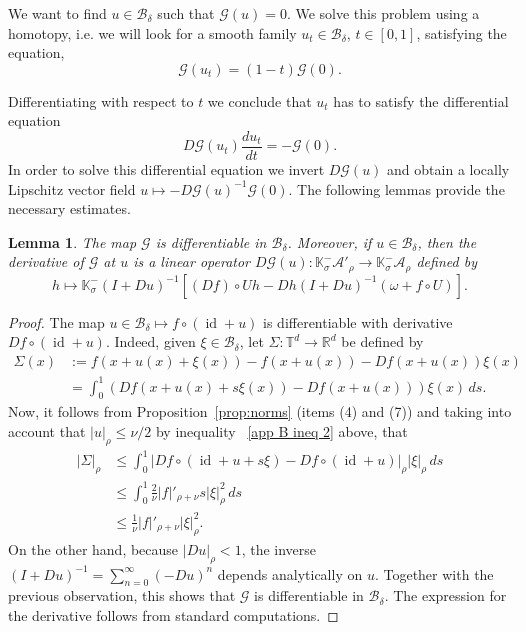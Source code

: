\documentclass[12pt,reqno,a4paper]{amsart}%
\numberwithin{equation}{section}
\newtheorem{lemma}[theorem]{Lemma}
\newcommand{\Bs}{{\mathscr{B}}}
\newcommand{\A}{{\mathcal A}}
\newcommand{\GG}{{\mathcal G}}
\newcommand{\Kk}{{\mathbb{K}}}
\newcommand{\Rr}{{\mathbb{R}}}
\newcommand{\Tt}{{\mathbb{T}}}
\newcommand{\id}  {\operatorname{id}}
\begin{document}
We want to find $u\in\Bs_{\delta}$ such that $\GG(u)=0$. We solve this problem using a homotopy, i.e. we will look for a smooth family $u_t\in\Bs_{\delta}$, $t\in[0,1]$, satisfying the equation,
$$
\GG(u_t)=(1-t)\GG(0).
$$



Differentiating with respect to $t$ we conclude that $u_t$ has to satisfy the differential equation
$$
D\GG(u_t)\frac{du_t}{dt}=-\GG(0).
$$
In order to solve this differential equation we invert $D\GG(u)$ and obtain a locally Lipschitz vector field $u\mapsto -D\GG(u)^{-1}\GG(0)$. The following lemmas provide the necessary estimates.


\begin{lemma}\label{lem:DGu}
The map $\GG$ is differentiable in $\Bs_\delta$.  Moreover,  if $u\in\Bs_{\delta}$, then the derivative of $\GG$ at $u$ is a linear operator $D\GG(u)\colon\Kk^-_\sigma\A'_{\rho}\to \Kk^-_\sigma\A_{\rho}$ defined by
\begin{equation}\label{eq:DF}
h\mapsto\Kk^-_\sigma(I+Du)^{-1}\left[(Df)\circ U h-Dh(I+Du)^{-1}(\omega+f\circ U)\right].
\end{equation}
\end{lemma}


\begin{proof}

The map $u\in\Bs_{\delta} \mapsto f\circ(\id+u)$ is differentiable with derivative $Df\circ(\id +u)$.  Indeed,  given $\xi\in \Bs_{\delta} $,  let $\Sigma\colon\Tt^d\to\Rr^d$ be defined by
\begin{align*}
\Sigma(x)&:=f(x + u(x) + \xi(x))-f(x+u(x))-Df(x+u(x))\xi(x) \\
&= \int_0^1 (Df(x + u(x) + s\xi(x))-Df(x+u(x)))\xi(x)\,ds.
\end{align*}
Now,  it follows from Proposition~\ref{prop:norms} (items (4) and (7)) and taking into account that $|u|_\rho\leq\nu/2$ by inequality ~\eqref{app B ineq 2} above, that
\begin{align*}
|\Sigma|_\rho&\leq \int_0^1 |Df\circ(\id + u + s\xi)-Df\circ(\id+u)|_\rho|\xi|_\rho\,ds\\
&\leq \int_0^1  \frac{2}{\nu}|f|'_{\rho+\nu} s |\xi|^2_\rho \,ds\\
&\leq  \frac{1}{\nu}|f|'_{\rho+\nu}  |\xi|^2_\rho.
\end{align*}
On the other hand,  because $|Du|_\rho<1$,  the inverse $(I+Du)^{-1}=\sum_{n=0}^\infty (-Du)^n$ depends analytically on $u$.  Together with the previous observation,  this shows that $\GG$ is differentiable in $\Bs_\delta$.  The expression for the derivative follows from standard computations.

\end{proof}
\end{document}
